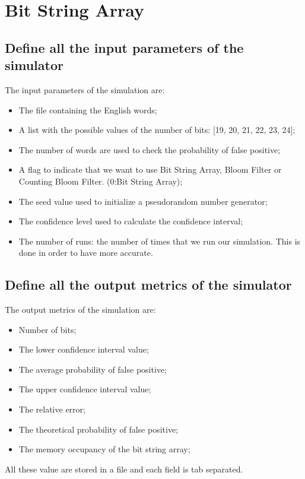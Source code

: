 \documentclass{report}
\begin{document}
{			\newpage
					
			
			\section{Bit String Array}	 
	 
				\subsection{Define all the input parameters of the simulator}
					The input parameters of the simulation are:
					\begin{itemize}
						\item The file containing the English words;
						\item A list with the possible values of the number of bits: [19, 20, 21, 22, 23, 24];
						\item The number of words are used to check the probability of false positive;
						\item A flag to indicate that we want to use Bit String Array, Bloom Filter or Counting Bloom Filter. (0:Bit String Array);
						\item The seed value used to initialize a pseudorandom number generator;
						\item The confidence level used to calculate the confidence interval;
						\item The number of runs: the number of times that we run our simulation. This is done in order to have more accurate.
					\end{itemize}
					 
				\subsection{Define all the output metrics of the simulator}
				The output metrics of the simulation are:
				\begin{itemize}
					\item Number of bits;
					\item The lower confidence interval value;
					\item The average probability of false positive;
					\item The upper confidence interval value;
					\item The relative error;
					\item The theoretical probability of false positive;
					\item The memory occupancy of the bit string array;
				\end{itemize}
				All these value are stored in a file and each field is tab separated.
			
}
\end{document}
